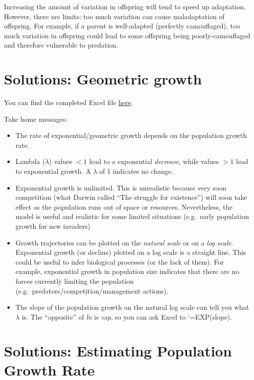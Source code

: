 \documentclass[
  a4paper]{book}
\providecommand{\tightlist}{%
  \setlength{\itemsep}{0pt}\setlength{\parskip}{0pt}}
\begin{document}
Increasing the amount of variation in offspring will tend to speed up adaptation. However, there are limits: too much variation can cause maladaptation of offspring. For example, if a parent is well-adapted (perfectly camouflaged), too much variation in offspring could lead to some offspring being poorly-camouflaged and therefore vulnerable to predation.

\section{Solutions: Geometric growth}\label{solutions-geometric-growth}

You can find the completed Excel file \href{https://www.dropbox.com/s/sfxu1lbrxyqt462/GeometricGrowth\%20-\%20complete.xlsx?dl=1}{here}.

Take home messages:

\begin{itemize}
\tightlist
\item
  The rate of exponential/geometric growth depends on the population growth rate.
\item
  Lambda (\(\lambda\)) values \(<1\) lead to a exponential \emph{decrease}, while values \(>1\) lead to exponential growth. A \(\lambda\) of 1 indicates no change.
\item
  Exponential growth is unlimited. This is unrealistic because very soon competition (what Darwin called ``The struggle for existence'') will soon take effect as the population runs out of space or resources. Nevertheless, the model is useful and realistic for some limited situations (e.g.~early population growth for new invaders)
\item
  Growth trajectories can be plotted on the \emph{natural scale} or on a \emph{log scale}. Exponential growth (or decline) plotted on a log scale is a straight line. This could be useful to infer biological processes (or the lack of them). For example, exponential growth in population size indicates that there are no forces currently limiting the population (e.g.~predators/competition/management actions).
\item
  The slope of the population growth on the natural log scale can tell you what \(\lambda\) is. The ``opposite'' of \emph{ln} is \emph{exp}, so you can ask Excel to `=EXP(slope).
\end{itemize}

\section{Solutions: Estimating Population Growth Rate}\label{solutions-estimating-population-growth-rate}
\end{document}
